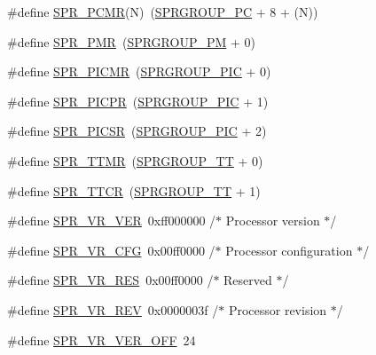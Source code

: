 \begin{DoxyCompactItemize}
\item 
\#define \hyperlink{spr-defs_8h_a90c22ef98a48259ad7c737b1eb0dba02}{\-S\-P\-R\-\_\-\-P\-C\-M\-R}(\-N)~(\hyperlink{spr-defs_8h_a018a0154cb10baa381263b907997d956}{\-S\-P\-R\-G\-R\-O\-U\-P\-\_\-\-P\-C} + 8 + (\-N))
\item 
\#define \hyperlink{spr-defs_8h_a762ccb859d94bff3a1135f64d422db3d}{\-S\-P\-R\-\_\-\-P\-M\-R}~(\hyperlink{spr-defs_8h_a4e5442d0b45b27ce5d83a2ca253468d7}{\-S\-P\-R\-G\-R\-O\-U\-P\-\_\-\-P\-M} + 0)
\item 
\#define \hyperlink{spr-defs_8h_ad3b5a040d959e2af5d760e9cc20d561e}{\-S\-P\-R\-\_\-\-P\-I\-C\-M\-R}~(\hyperlink{spr-defs_8h_a4b2a52e3f421cf588d9b58272b154e82}{\-S\-P\-R\-G\-R\-O\-U\-P\-\_\-\-P\-I\-C} + 0)
\item 
\#define \hyperlink{spr-defs_8h_ab41f118450ac566cde4b0a7ee3656590}{\-S\-P\-R\-\_\-\-P\-I\-C\-P\-R}~(\hyperlink{spr-defs_8h_a4b2a52e3f421cf588d9b58272b154e82}{\-S\-P\-R\-G\-R\-O\-U\-P\-\_\-\-P\-I\-C} + 1)
\item 
\#define \hyperlink{spr-defs_8h_a196db732529b6d14bcc6490e2f7bc23d}{\-S\-P\-R\-\_\-\-P\-I\-C\-S\-R}~(\hyperlink{spr-defs_8h_a4b2a52e3f421cf588d9b58272b154e82}{\-S\-P\-R\-G\-R\-O\-U\-P\-\_\-\-P\-I\-C} + 2)
\item 
\#define \hyperlink{spr-defs_8h_a666d2b589d0e9c5d4ad72a9b41047caa}{\-S\-P\-R\-\_\-\-T\-T\-M\-R}~(\hyperlink{spr-defs_8h_a030889d273c4edb4d81050e7a1cb6726}{\-S\-P\-R\-G\-R\-O\-U\-P\-\_\-\-T\-T} + 0)
\item 
\#define \hyperlink{spr-defs_8h_a540e74e34834638104d51a4f12d21720}{\-S\-P\-R\-\_\-\-T\-T\-C\-R}~(\hyperlink{spr-defs_8h_a030889d273c4edb4d81050e7a1cb6726}{\-S\-P\-R\-G\-R\-O\-U\-P\-\_\-\-T\-T} + 1)
\item 
\#define \hyperlink{spr-defs_8h_a05fd3fa48430ae0dc62003e2202316f6}{\-S\-P\-R\-\_\-\-V\-R\-\_\-\-V\-E\-R}~0xff000000  /$\ast$ Processor version $\ast$/
\item 
\#define \hyperlink{spr-defs_8h_a0e3beda0d9a38b83a4f2ad2bd4129e03}{\-S\-P\-R\-\_\-\-V\-R\-\_\-\-C\-F\-G}~0x00ff0000  /$\ast$ Processor configuration $\ast$/
\item 
\#define \hyperlink{spr-defs_8h_a8329d53fe97ad12f28617b8beea0bb32}{\-S\-P\-R\-\_\-\-V\-R\-\_\-\-R\-E\-S}~0x00ff0000  /$\ast$ Reserved $\ast$/
\item 
\#define \hyperlink{spr-defs_8h_ab3d4aaf10e9000b1fcf8ec3dcc793508}{\-S\-P\-R\-\_\-\-V\-R\-\_\-\-R\-E\-V}~0x0000003f  /$\ast$ Processor revision $\ast$/
\item 
\#define \hyperlink{spr-defs_8h_a130040317649e455d45d0d3d8d7b6f49}{\-S\-P\-R\-\_\-\-V\-R\-\_\-\-V\-E\-R\-\_\-\-O\-F\-F}~24

\end{DoxyCompactItemize}
